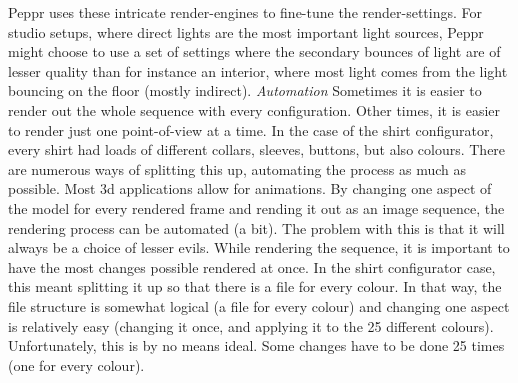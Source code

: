 Peppr uses these intricate render-engines to fine-tune the render-settings. For studio setups, where direct lights are the most important light sources, Peppr might choose to use a set of settings where the secondary bounces of light are of lesser quality than for instance an interior, where most light comes from the light bouncing on the floor (mostly indirect).
\newline
\newline
\textit{Automation}
\newline
Sometimes it is easier to render out the whole sequence with every configuration. Other times, it is easier to render just one point-of-view at a time. In the case of the shirt configurator, every shirt had loads of different collars, sleeves, buttons, but also colours. There are numerous ways of splitting this up, automating the process as much as possible. Most 3d applications allow for animations. By changing one aspect of the model for every rendered frame and rending it out as an image sequence, the rendering process can be automated (a bit). The problem with this is that it will always be a choice of lesser evils. While rendering the sequence, it is important to have the most changes possible rendered at once. In the shirt configurator case, this meant splitting it up so that there is a file for every colour. In that way, the file structure is somewhat logical (a file for every colour) and changing one aspect is relatively easy (changing it once, and applying it to the 25 different colours). Unfortunately, this is by no means ideal. Some changes have to be done 25 times (one for every colour).


